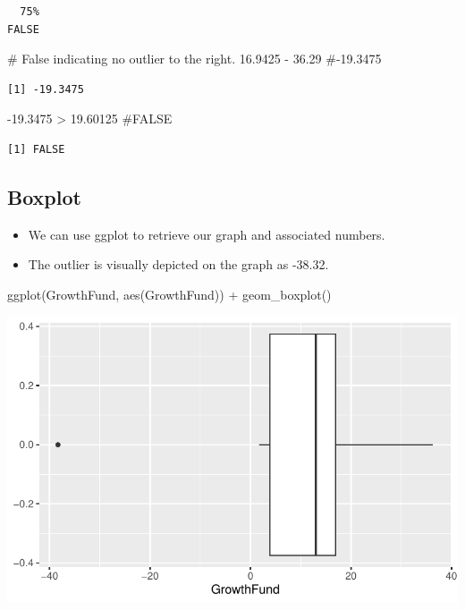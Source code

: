\documentclass[
  letterpaper,
  DIV=11,
  numbers=noendperiod]{scrreprt}
\newenvironment{Shaded}{\begin{snugshade}}{\end{snugshade}}
\newcommand{\CommentTok}[1]{\textcolor[rgb]{0.37,0.37,0.37}{#1}}
\newcommand{\FloatTok}[1]{\textcolor[rgb]{0.68,0.00,0.00}{#1}}
\newcommand{\FunctionTok}[1]{\textcolor[rgb]{0.28,0.35,0.67}{#1}}
\newcommand{\NormalTok}[1]{\textcolor[rgb]{0.00,0.23,0.31}{#1}}
\newcommand{\SpecialCharTok}[1]{\textcolor[rgb]{0.37,0.37,0.37}{#1}}
\providecommand{\tightlist}{%
  \setlength{\itemsep}{0pt}\setlength{\parskip}{0pt}}\usepackage{longtable,booktabs,array}
\begin{document}
\begin{verbatim}
  75% 
FALSE 
\end{verbatim}

\begin{Shaded}
\begin{Highlighting}[]
\CommentTok{\# False indicating no outlier to the right.}
\FloatTok{16.9425} \SpecialCharTok{{-}} \FloatTok{36.29}  \CommentTok{\#{-}19.3475}
\end{Highlighting}
\end{Shaded}

\begin{verbatim}
[1] -19.3475
\end{verbatim}

\begin{Shaded}
\begin{Highlighting}[]
\SpecialCharTok{{-}}\FloatTok{19.3475} \SpecialCharTok{\textgreater{}} \FloatTok{19.60125}  \CommentTok{\#FALSE }
\end{Highlighting}
\end{Shaded}

\begin{verbatim}
[1] FALSE
\end{verbatim}

\subsection{Boxplot}\label{boxplot-1}

\begin{itemize}
\tightlist
\item
  We can use ggplot to retrieve our graph and associated numbers.
\item
  The outlier is visually depicted on the graph as -38.32.
\end{itemize}

\begin{Shaded}
\begin{Highlighting}[]
\FunctionTok{ggplot}\NormalTok{(GrowthFund, }\FunctionTok{aes}\NormalTok{(GrowthFund)) }\SpecialCharTok{+} \FunctionTok{geom\_boxplot}\NormalTok{()}
\end{Highlighting}
\end{Shaded}

\includegraphics{dataviz_files/figure-pdf/unnamed-chunk-30-1.pdf}
\end{document}
